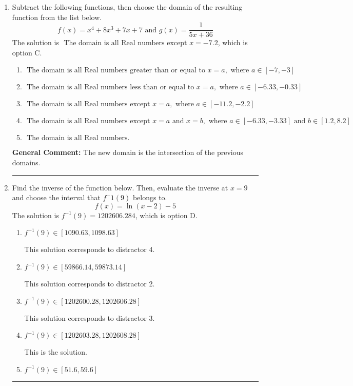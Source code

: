 \documentclass{extbook}[14pt]
\newcommand{\litem}[1]{\item #1

\rule{\textwidth}{0.4pt}}
\begin{document}
\begin{enumerate}\litem{
Subtract the following functions, then choose the domain of the resulting function from the list below.
\[ f(x) = x^{4} +8 x^{3} +7 x + 7 \text{ and } g(x) = \frac{1}{5x+36} \]The solution is \( \text{ The domain is all Real numbers except } x = -7.2 \), which is option C.\begin{enumerate}[label=\Alph*.]
\item \( \text{ The domain is all Real numbers greater than or equal to } x = a, \text{ where } a \in [-7, -3] \)


\item \( \text{ The domain is all Real numbers less than or equal to } x = a, \text{ where } a \in [-6.33, -0.33] \)


\item \( \text{ The domain is all Real numbers except } x = a, \text{ where } a \in [-11.2, -2.2] \)


\item \( \text{ The domain is all Real numbers except } x = a \text{ and } x = b, \text{ where } a \in [-6.33, -3.33] \text{ and } b \in [1.2, 8.2] \)


\item \( \text{ The domain is all Real numbers. } \)


\end{enumerate}

\textbf{General Comment:} The new domain is the intersection of the previous domains.
}
\litem{
Find the inverse of the function below. Then, evaluate the inverse at $x = 9$ and choose the interval that $f^-1(9)$ belongs to.
\[ f(x) = \ln{(x-2)}-5 \]The solution is \( f^{-1}(9) = 1202606.284 \), which is option D.\begin{enumerate}[label=\Alph*.]
\item \( f^{-1}(9) \in [1090.63, 1098.63] \)

 This solution corresponds to distractor 4.
\item \( f^{-1}(9) \in [59866.14, 59873.14] \)

 This solution corresponds to distractor 2.
\item \( f^{-1}(9) \in [1202600.28, 1202606.28] \)

 This solution corresponds to distractor 3.
\item \( f^{-1}(9) \in [1202603.28, 1202608.28] \)

 This is the solution.
\item \( f^{-1}(9) \in [51.6, 59.6] \)


\end{enumerate}}
\end{enumerate}
\end{document}
